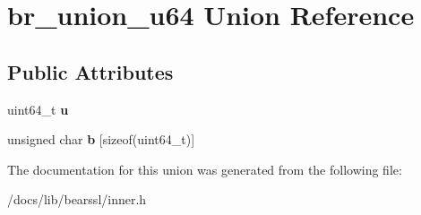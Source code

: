 \hypertarget{unionbr__union__u64}{}\section{br\+\_\+union\+\_\+u64 Union Reference}
\label{unionbr__union__u64}
\subsection*{Public Attributes}
\begin{DoxyCompactItemize}
\item 
\mbox{\label{unionbr__union__u64_aca5e6615a13e0fd86b6dfc0a3ac9befa}} 
uint64\+\_\+t {\bfseries u}
\item 
\mbox{\label{unionbr__union__u64_a3a0628b889869a3c22e375391e1b0aad}} 
unsigned char {\bfseries b} \mbox{[}sizeof(uint64\+\_\+t)\mbox{]}
\end{DoxyCompactItemize}


The documentation for this union was generated from the following file\+:\begin{DoxyCompactItemize}
\item 
/docs/lib/bearssl/inner.\+h\end{DoxyCompactItemize}
